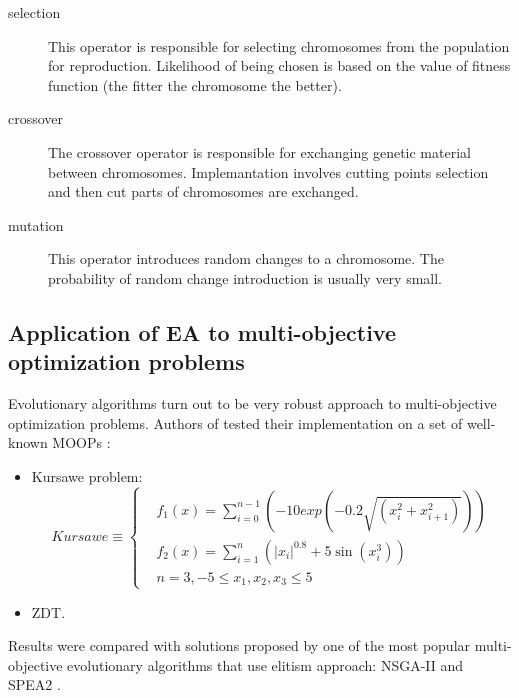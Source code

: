 \begin{description}

\item[selection]
  This operator is responsible for selecting chromosomes from the population for reproduction.
  Likelihood of being chosen is based on the value of fitness function (the fitter the chromosome the better).
  
\item[crossover]
  The crossover operator is responsible for exchanging genetic material between chromosomes.
  Implemantation involves cutting points selection and then cut parts of chromosomes are exchanged.

\item[mutation]
  This operator introduces random changes to a chromosome.
  The probability of random change introduction is usually very small.  

\end{description}

\subsection{Application of EA to multi-objective optimization problems}

Evolutionary algorithms turn out to be very robust approach to multi-objective optimization problems.
Authors of \cite{drezewski2010review} tested their implementation on a set of well-known MOOPs \cite{drezewski2010review}:

\begin{itemize}
 \item Kursawe problem: \begin{equation} 
Kursawe \equiv
 \begin{cases}
       & f_{1}(x) = \sum_{i = 0}^{n - 1}(-10exp(-0.2\sqrt{(x_{i}^{2} + x_{i + 1}^2)})) \\
       &  f_{2}(x) = \sum_{i = 1}^{n}(|x_{i}|^{0.8} + 5 \sin({x_{i}^3}))  \\ 
			  &  n = 3,  -5 \leq x_{1}, x_{2}, x_{3} \leq 5 
			  
\end{cases}  
\end{equation}

  \item ZDT.
    
\end{itemize}

Results were compared with solutions proposed by one of the most popular multi-objective evolutionary algorithms that use elitism
 approach: NSGA-II and SPEA2 \cite{drezewski2010review}.

